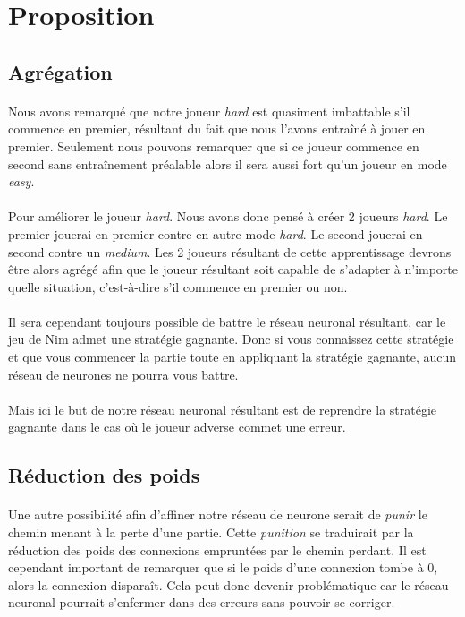 \documentclass{article}
\begin{document}
\newpage

\section{Proposition}
  \subsection{Agrégation}
  \paragraph{} 
    Nous avons remarqué que notre joueur \emph{hard} est quasiment imbattable s'il commence en premier,
    résultant du fait que nous l'avons entraîné à jouer en premier. Seulement nous pouvons remarquer que si ce joueur commence 
    en second sans entraînement préalable alors il sera aussi fort qu'un joueur en mode \emph{easy}.
  \paragraph{}
    Pour améliorer le joueur \emph{hard}. Nous avons donc pensé à créer 2 joueurs \emph{hard}. Le premier jouerai en premier contre en autre
    mode \emph{hard}. Le second jouerai en second contre un \emph{medium}. Les 2 joueurs résultant de cette apprentissage devrons être alors 
    agrégé afin que le joueur résultant soit capable de s'adapter à n'importe quelle situation, c'est-à-dire s'il commence en premier ou non.
  \paragraph{}
    Il sera cependant toujours possible de battre le réseau neuronal résultant, car le jeu de Nim admet une stratégie gagnante. Donc si vous connaissez cette stratégie
    et que vous commencer la partie toute en appliquant la stratégie gagnante, aucun réseau de neurones ne pourra vous battre.
  \paragraph{}
    Mais ici le but de notre réseau neuronal résultant est de reprendre la stratégie gagnante dans le cas où le joueur adverse commet une erreur.
    
  \subsection{Réduction des poids}
  \paragraph{}
    Une autre possibilité afin d’affiner notre réseau de neurone serait de \emph{punir} le chemin menant à la perte d'une partie.
    Cette \emph{punition} se traduirait par la réduction des poids des connexions empruntées par le chemin perdant.
    Il est cependant important de remarquer que si le poids d'une connexion tombe à 0, alors la connexion disparaît. Cela peut donc devenir problématique
    car le réseau neuronal pourrait s'enfermer dans des erreurs sans pouvoir se corriger.
\end{document}
